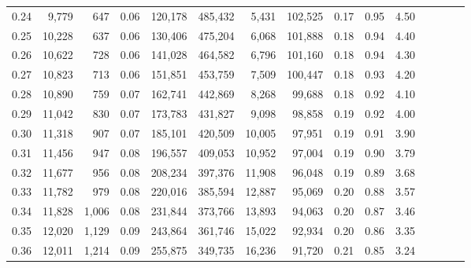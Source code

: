 \begin{tabular}{rrrcrrrrrrrrrrr}
0.24 &   9,779 &    647 &                                       0.06 &  120,178 &  485,432 &    5,431 &  102,525 &  0.17 &  0.95 &                         4.50 \\
0.25 &  10,228 &    637 &                                       0.06 &  130,406 &  475,204 &    6,068 &  101,888 &  0.18 &  0.94 &                         4.40 \\
0.26 &  10,622 &    728 &                                       0.06 &  141,028 &  464,582 &    6,796 &  101,160 &  0.18 &  0.94 &                         4.30 \\
0.27 &  10,823 &    713 &                                       0.06 &  151,851 &  453,759 &    7,509 &  100,447 &  0.18 &  0.93 &                         4.20 \\
0.28 &  10,890 &    759 &                                       0.07 &  162,741 &  442,869 &    8,268 &   99,688 &  0.18 &  0.92 &                         4.10 \\
0.29 &  11,042 &    830 &                                       0.07 &  173,783 &  431,827 &    9,098 &   98,858 &  0.19 &  0.92 &                         4.00 \\
0.30 &  11,318 &    907 &                                       0.07 &  185,101 &  420,509 &   10,005 &   97,951 &  0.19 &  0.91 &                         3.90 \\
0.31 &  11,456 &    947 &                                       0.08 &  196,557 &  409,053 &   10,952 &   97,004 &  0.19 &  0.90 &                         3.79 \\
0.32 &  11,677 &    956 &                                       0.08 &  208,234 &  397,376 &   11,908 &   96,048 &  0.19 &  0.89 &                         3.68 \\
0.33 &  11,782 &    979 &                                       0.08 &  220,016 &  385,594 &   12,887 &   95,069 &  0.20 &  0.88 &                         3.57 \\
0.34 &  11,828 &  1,006 &                                       0.08 &  231,844 &  373,766 &   13,893 &   94,063 &  0.20 &  0.87 &                         3.46 \\
0.35 &  12,020 &  1,129 &                                       0.09 &  243,864 &  361,746 &   15,022 &   92,934 &  0.20 &  0.86 &                         3.35 \\
0.36 &  12,011 &  1,214 &                                       0.09 &  255,875 &  349,735 &   16,236 &   91,720 &  0.21 &  0.85 &                         3.24 \\

\end{tabular}
